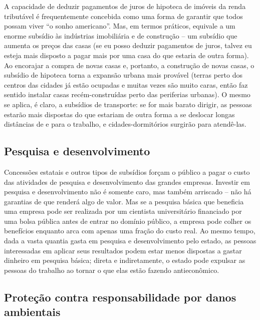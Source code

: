 A capacidade de deduzir pagamentos de juros de hipoteca de imóveis da renda tributável é frequentemente concebida como uma forma de garantir que todos possam viver ``o sonho americano''. Mas, em termos práticos, equivale a um enorme subsídio às indústrias imobiliária e de construção -- um subsídio que aumenta os preços das casas (se eu posso deduzir pagamentos de juros, talvez eu esteja mais disposto a pagar mais por uma casa do que estaria de outra forma). Ao encorajar a compra de novas casas e, portanto, a construção de novas casas, o subsídio de hipoteca torna a expansão urbana mais provável (terras perto dos centros das cidades já estão ocupadas e muitas vezes são muito caras, então faz sentido instalar casas recém-construídas perto das periferias urbanas). O mesmo se aplica, é claro, a subsídios de transporte: se for mais barato dirigir, as pessoas estarão mais dispostas do que estariam de outra forma a se deslocar longas distâncias de e para o trabalho, e cidades-dormitórios surgirão para atendê-las.

\subsection*{Pesquisa e desenvolvimento}

Concessões estatais e outros tipos de subsídios forçam o público a pagar o custo das atividades de pesquisa e desenvolvimento das grandes empresas. Investir em pesquisa e desenvolvimento não é somente caro, mas também arriscado -- não há garantias de que renderá algo de valor. Mas se a pesquisa básica que beneficia uma empresa pode ser realizada por um cientista universitário financiado por uma bolsa pública antes de entrar no domínio público, a empresa pode colher os benefícios enquanto arca com apenas uma fração do custo real. Ao mesmo tempo, dada a vasta quantia gasta em pesquisa e desenvolvimento pelo estado, as pessoas interessadas em aplicar seus resultados podem estar menos dispostas a gastar dinheiro em pesquisa básica; direta e indiretamente, o estado pode expulsar as pessoas do trabalho ao tornar o que elas estão fazendo antieconômico.

\subsection*{Proteção contra responsabilidade por danos ambientais}


